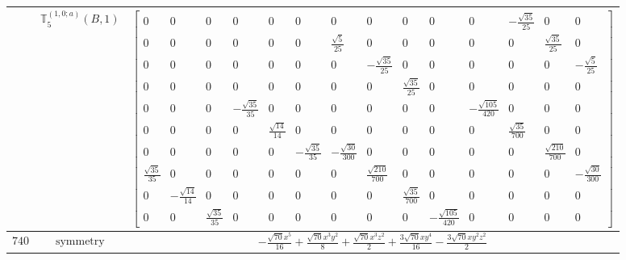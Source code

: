 \documentclass[fleqn,8pt,landscape]{jsarticle}
\begin{document}
\begin{longtable}{ccc}
$  $ & $ \mathbb{T}_{5}^{(1,0;a)}(B,1) $ & $ \begin{bmatrix} 0 & 0 & 0 & 0 & 0 & 0 & 0 & 0 & 0 & 0 & 0 & - \frac{\sqrt{35}}{25} & 0 & 0 \\ 0 & 0 & 0 & 0 & 0 & 0 & \frac{\sqrt{5}}{25} & 0 & 0 & 0 & 0 & 0 & \frac{\sqrt{35}}{25} & 0 \\ 0 & 0 & 0 & 0 & 0 & 0 & 0 & - \frac{\sqrt{35}}{25} & 0 & 0 & 0 & 0 & 0 & - \frac{\sqrt{5}}{25} \\ 0 & 0 & 0 & 0 & 0 & 0 & 0 & 0 & \frac{\sqrt{35}}{25} & 0 & 0 & 0 & 0 & 0 \\ 0 & 0 & 0 & - \frac{\sqrt{35}}{35} & 0 & 0 & 0 & 0 & 0 & 0 & - \frac{\sqrt{105}}{420} & 0 & 0 & 0 \\ 0 & 0 & 0 & 0 & \frac{\sqrt{14}}{14} & 0 & 0 & 0 & 0 & 0 & 0 & \frac{\sqrt{35}}{700} & 0 & 0 \\ 0 & 0 & 0 & 0 & 0 & - \frac{\sqrt{35}}{35} & - \frac{\sqrt{30}}{300} & 0 & 0 & 0 & 0 & 0 & \frac{\sqrt{210}}{700} & 0 \\ \frac{\sqrt{35}}{35} & 0 & 0 & 0 & 0 & 0 & 0 & \frac{\sqrt{210}}{700} & 0 & 0 & 0 & 0 & 0 & - \frac{\sqrt{30}}{300} \\ 0 & - \frac{\sqrt{14}}{14} & 0 & 0 & 0 & 0 & 0 & 0 & \frac{\sqrt{35}}{700} & 0 & 0 & 0 & 0 & 0 \\ 0 & 0 & \frac{\sqrt{35}}{35} & 0 & 0 & 0 & 0 & 0 & 0 & - \frac{\sqrt{105}}{420} & 0 & 0 & 0 & 0 \end{bmatrix} $ \\ \hline
$ 740 $ & $ \text{symmetry} $ & $ - \frac{\sqrt{70} x^{5}}{16} + \frac{\sqrt{70} x^{3} y^{2}}{8} + \frac{\sqrt{70} x^{3} z^{2}}{2} + \frac{3 \sqrt{70} x y^{4}}{16} - \frac{3 \sqrt{70} x y^{2} z^{2}}{2} $ \\

\end{longtable}
\end{document}
